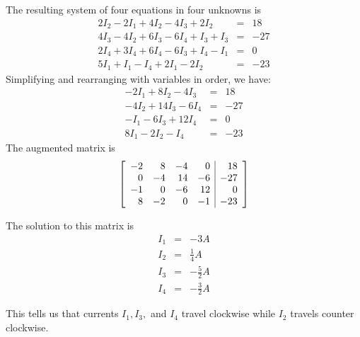 \begin{solution}
The resulting system of four equations in four unknowns is 
\begin{eqnarray*}
2I_{2}-2I_{1}+4I_{2}-4I_{3}+2I_{2}&=&18 \\
4I_{3} - 4I_{2} + 6I_{3} - 6I_{4} + I_{3} + I_{3} &=& -27 \\
2I_{4} + 3I_{4} + 6I_{4} - 6I_{3} + I_{4} - I_{1} &=& 0 \\
5I_{1}+I_{1}-I_{4}+2I_{1}-2I_{2}&=& -23
\end{eqnarray*}
Simplifying and rearranging with variables in order, we have:
\begin{eqnarray*}
-2I_{1}+8I_{2}-4I_{3}&=&18 \\
- 4I_{2} + 14I_{3} - 6I_{4} &=& -27 \\
-I_{1} - 6I_{3} + 12I_{4} &=& 0 \\
8I_{1}-2I_{2} - I_{4} &=& -23
\end{eqnarray*}
The augmented matrix is 
\[
\left[
\begin{array}{rrrr|r}
-2 & 8 & -4 & 0 & 18 \\
0 & -4 & 14 & -6 & -27 \\
-1 & 0 & -6 & 12 & 0 \\
8 & -2 & 0 & -1 & -23
\end{array}
\right]
\]

The solution to this matrix is
\begin{eqnarray*}
I_{1} &=& -3 A\\
I_{2} &=& \frac{1}{4} A\\
I_{3} &=& -\frac{5}{2} A\\
I_{4} &=& -\frac{3}{2} A
\end{eqnarray*}

This tells us that currents $I_1, I_3,$ and $I_4$ travel clockwise while $I_2$ travels counter clockwise. 
\end{solution}

